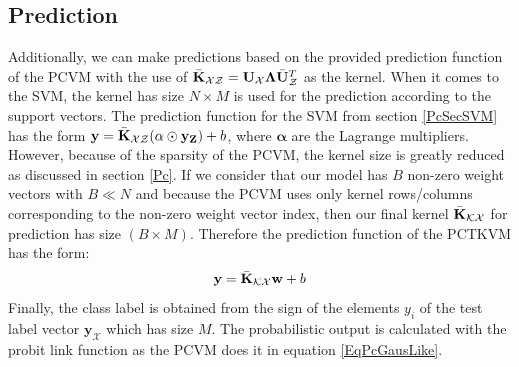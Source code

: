 \subsection{Prediction}\label{InSubSecPrediction}
Additionally, we can make predictions based on the provided prediction function of the \acs{PCVM} with the use of $\bar{\mathbf{K}}_\mathcal{XZ} = \mathbf{U}_\mathcal{X}\mathbf{\Lambda}\bar{\mathbf{U}}_\mathcal{Z}^T$ as the kernel.
When it comes to the \acs{SVM}, the kernel has size $N\times M$ is used for the prediction according to the support vectors.
The prediction function for the \acs{SVM} from section \ref{PcSecSVM} has the form $\mathbf{y} = \bar{\mathbf{K}}_\mathcal{XZ}(\mathbf{\alpha}\odot\mathbf{y}_\mathbf{Z})+b$, where $\mathbf{\alpha}$ are the Lagrange multipliers.\cite{Long.2015}\newline
However, because of the sparsity of the \acs{PCVM}, the kernel size is greatly reduced as discussed in section \ref{Pc}.
If we consider that our model has $B$ non-zero weight vectors with $B\ll N$ and because the \acs{PCVM} uses only kernel rows/columns corresponding to the non-zero weight vector index, then our final kernel $\bar{\mathbf{K}}_\mathcal{KX}$ for prediction has size $(B\times M)$.
Therefore the prediction function of the \acs{PCTKVM} has the form:
\begin{equation}
\mathbf{y} = \bar{\mathbf{K}}_\mathcal{KX}\mathbf{w}+b
\end{equation}
Finally, the class label is obtained from the sign of the elements $y_i$ of the test label vector $\mathbf{y}_\mathcal{X}$ which has size $M$.
The probabilistic output is calculated with the probit link function as the \acs{PCVM} does it in equation \ref{EqPcGausLike}.

